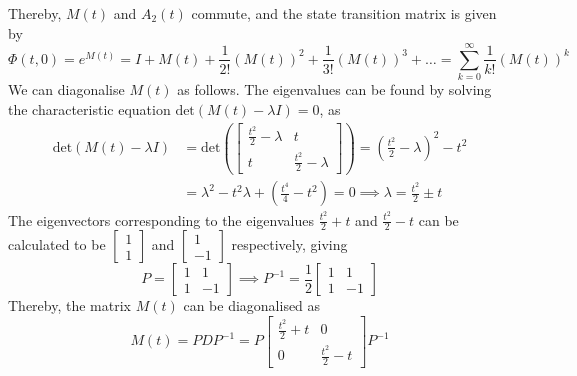 Thereby, \( M(t) \) and \( A_2(t) \) commute, and the state transition matrix is given by
\begin{equation*}
    \Phi(t, 0)
    =
    e^{M(t)}
    =
    I + M(t) + \frac{1}{2!} {(M(t))}^2 + \frac{1}{3!} {(M(t))}^3 + \ldots
    =
    \sum_{k=0}^{\infty} \frac{1}{k!} {(M(t))}^k
\end{equation*}
We can diagonalise \( M(t) \) as follows.
The eigenvalues can be found by solving the characteristic equation \( \text{det}(M(t) - \lambda I) = 0 \), as
\begin{align*}
    \text{det}(M(t) - \lambda I)
     & =
    \text{det}\left(
    \begin{bmatrix}
            \frac{t^2}{2} - \lambda & t                       \\
            t                       & \frac{t^2}{2} - \lambda
        \end{bmatrix}
    \right)
    =
    \left( \frac{t^2}{2} - \lambda \right)^2 - t^2
    \\ & =
    \lambda^2 - t^2 \lambda + \left(\frac{t^4}{4} - t^2\right)
    =
    0
    \implies
    \lambda
    =
    \frac{t^2}{2} \pm t
\end{align*}
The eigenvectors corresponding to the eigenvalues \( \frac{t^2}{2} + t \) and \( \frac{t^2}{2} - t \) can be calculated to be \( \begin{bmatrix} 1 \\ 1 \end{bmatrix} \) and \( \begin{bmatrix} 1 \\ -1 \end{bmatrix} \) respectively, giving
\begin{equation*}
    P = \begin{bmatrix}
        1 & 1  \\
        1 & -1
    \end{bmatrix}
    \implies
    P^{-1} = \frac{1}{2} \begin{bmatrix}
        1 & 1  \\
        1 & -1
    \end{bmatrix}
\end{equation*}
Thereby, the matrix \( M(t) \) can be diagonalised as
\begin{equation*}
    M(t)
    =
    PDP^{-1}
    =
    P
    \begin{bmatrix}
        \frac{t^2}{2} + t & 0                 \\
        0                 & \frac{t^2}{2} - t
    \end{bmatrix}
    P^{-1}
\end{equation*}
